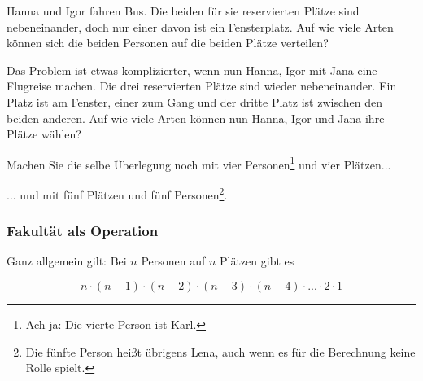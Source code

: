 
Hanna und Igor fahren Bus. Die beiden für sie reservierten Plätze sind
nebeneinander, doch nur einer davon ist ein Fensterplatz. Auf wie
viele Arten können sich die beiden Personen auf die beiden Plätze
verteilen?


Das Problem ist etwas komplizierter, wenn nun Hanna, Igor mit Jana
eine Flugreise machen. Die drei reservierten Plätze sind wieder
nebeneinander. Ein Platz ist am Fenster, einer zum Gang und der dritte
Platz ist zwischen den beiden anderen. Auf wie viele Arten können nun
Hanna, Igor und Jana ihre Plätze wählen?


Machen Sie die selbe Überlegung noch mit vier Personen\footnote{Ach ja: Die vierte Person ist Karl.} und vier
Plätzen...


... und mit fünf Plätzen und fünf Personen\footnote{Die fünfte Person heißt übrigens Lena, auch wenn es für die Berechnung keine Rolle spielt.}.

\newpage


\subsubsection{Fakultät als Operation}

Ganz allgemein gilt: Bei $n$ Personen auf $n$ Plätzen gibt es

$$n\cdot{} (n-1) \cdot{} (n-2) \cdot{} (n-3) \cdot{} (n-4) \cdot{}
... \cdot{} 2 \cdot{} 1$$

